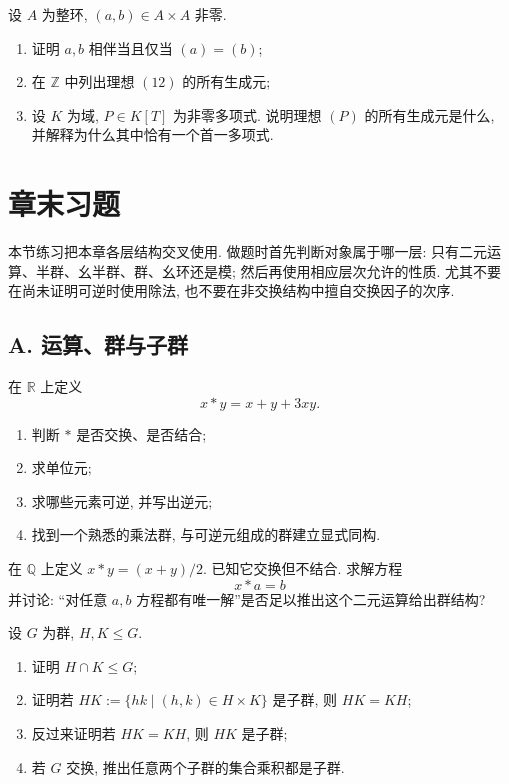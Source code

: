\documentclass[usesamecnt, thmcnt=section, lang=cn, newtx, 10pt, scheme=chinese]{elegantbook}
\begin{document}
\begin{exercise}\label{ex:alg-pid-ideal-generators}
设 $A$ 为整环, $(a,b)\in A\times A$ 非零.
\begin{enumerate}[label=\rm(\arabic*)]
  \item 证明 $a,b$ 相伴当且仅当 $(a)=(b)$;
  \item 在 $\mathbb Z$ 中列出理想 $(12)$ 的所有生成元;
  \item 设 $K$ 为域, $P\in K[T]$ 为非零多项式. 说明理想 $(P)$ 的所有生成元是什么, 并解释为什么其中恰有一个首一多项式.
\end{enumerate}
\end{exercise}

\section{章末习题}

本节练习把本章各层结构交叉使用. 做题时首先判断对象属于哪一层: 只有二元运算、半群、幺半群、群、幺环还是模; 然后再使用相应层次允许的性质. 尤其不要在尚未证明可逆时使用除法, 也不要在非交换结构中擅自交换因子的次序.

\subsection*{A. 运算、群与子群}

\begin{exercise}\label{ex:alg-end-01}
在 $\mathbb R$ 上定义
\[
 x*y=x+y+3xy.
\]
\begin{enumerate}[label=\rm(\arabic*)]
  \item 判断 $*$ 是否交换、是否结合;
  \item 求单位元;
  \item 求哪些元素可逆, 并写出逆元;
  \item 找到一个熟悉的乘法群, 与可逆元组成的群建立显式同构.
\end{enumerate}
\end{exercise}

\begin{exercise}\label{ex:alg-end-02}
在 $\mathbb Q$ 上定义 $x*y=(x+y)/2$. 已知它交换但不结合. 求解方程
\[
 x*a=b
\]
并讨论: ``对任意 $a,b$ 方程都有唯一解''是否足以推出这个二元运算给出群结构?
\end{exercise}

\begin{exercise}\label{ex:alg-end-03}
设 $G$ 为群, $H,K\leq G$.
\begin{enumerate}[label=\rm(\arabic*)]
  \item 证明 $H\cap K\leq G$;
  \item 证明若 $HK:=\{hk\mid (h,k)\in H\times K\}$ 是子群, 则 $HK=KH$;
  \item 反过来证明若 $HK=KH$, 则 $HK$ 是子群;
  \item 若 $G$ 交换, 推出任意两个子群的集合乘积都是子群.
\end{enumerate}
\end{exercise}
\end{document}
